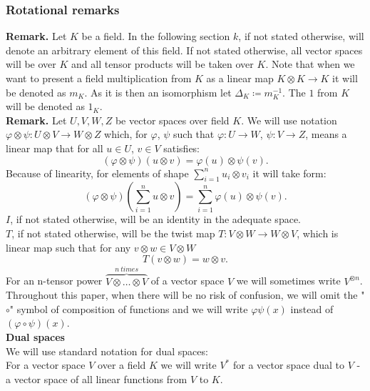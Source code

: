 \documentclass[a4paper, 12pt]{article}
\begin{document}
\subsubsection{Rotational remarks}
\indent \textbf{Remark. }Let $K$ be a field. In the following section $k$, if not stated otherwise, will
denote an arbitrary element of this field. If not stated otherwise, all vector spaces will be over $K$
and all tensor products will be taken over $K$. Note that when we want to present a field
multiplication from $K$ as a linear map $K \otimes K \to K$ it will be denoted as $m_K$. As it is then an
isomorphism let $\Delta_K \coloneqq m_K^{-1}$. The $1$ from $K$ will be denoted as $1_K$.\\[8pt]
\textbf{Remark. } Let $U, V, W, Z$ be vector spaces over field $K$.
We will use notation
$\varphi \otimes \psi:U \otimes V \to W \otimes Z$ which, for
$\varphi$, $\psi$ such that $\varphi : U \to W$, $\psi : V \to Z$, means a linear map that
for all $u \in U$, $v \in V$ satisfies:
\begin{equation*}
(\varphi \otimes \psi)(u \otimes v) = \varphi(u) \otimes \psi(v).
\end{equation*}
Because of linearity, for elements of shape $\displaystyle\sum^n_{i=1} u_i \otimes v_i$ it will take form:
\begin{equation*}
(\varphi \otimes \psi)(\sum^n_{i = 1} u \otimes v) = \sum^n_{i = 1}\varphi(u) \otimes \psi(v).
\end{equation*}
$I$, if not stated otherwise, will be an identity in the adequate space. \\
$T$, if not stated otherwise, will
be the twist map $T:V \otimes W \to W\otimes V$, which is linear map such that for any $v \otimes w
\in V \otimes W$
\begin{equation*}
T(v \otimes w) = w\otimes v.
\end{equation*}
For an n-tensor power $\overbrace{V \otimes \dots \otimes V}^{n\ times}$  of a vector space $V$ we will
sometimes write $V^{\otimes n}$.\\
Throughout this paper, when there will be no risk
of confusion, we will omit the "$\circ$" symbol of composition of functions and we will write
$\varphi \psi (x)$ instead of $(\varphi \circ \psi)(x)$. \\
\textbf{Dual spaces} \\
We will use standard notation for dual spaces: \\
For a vector space $V$ over a field $K$ we will write $V^*$ for a vector space dual to $V$ -
a vector space of all linear functions from $V$ to $K$.
\end{document}
